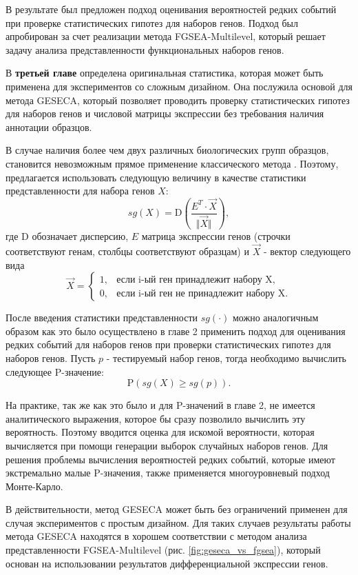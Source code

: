 В результате был предложен подход оценивания вероятностей редких событий при проверке статистических гипотез для наборов генов.
Подход был апробирован за счет реализации метода FGSEA-Multilevel, который решает задачу анализа представленности функциональных наборов генов.

В \textbf{третьей главе} определена оригинальная статистика, которая может быть применена для экспериментов со сложным дизайном.
Она послужила основой для метода GESECA, который позволяет проводить проверку статистических гипотез для наборов генов и числовой матрицы экспрессии без требования наличия аннотации образцов.

В случае наличия более чем двух различных биологических групп образцов, становится невозможным прямое применение классического метода \cite{subramanian2005gene}.
Поэтому, предлагается использовать следующую величину в качестве статистики представленности для набора генов $X$:
\[
       sg(X) = \mathrm{D} \left(\frac{E^T \cdot \overrightarrow{X}}{\Vert \overrightarrow{X} \Vert}\right),
\]
где $\mathrm{D}$ обозначает дисперсию, $E$ матрица экспрессии генов (строчки соответствуют генам, столбцы соответствуют образцам) и $\overrightarrow{X}$ - вектор следующего вида
\[
    \overrightarrow{X} = \begin{cases}
        1, & \text{если i-ый ген принадлежит набору X}, \\
        0, & \text{если i-ый ген не принадлежит набору X}.
    \end{cases}
\]

После введения статистики представленности $sg(\cdot)$ можно аналогичным образом как это было осуществлено в главе 2  применить подход для оценивания редких событий для наборов генов при проверки статистических гипотез для наборов генов.
Пусть $p$ - тестируемый набор генов, тогда необходимо вычислить следующее P-значение:
\[
    \mathrm{P} \left( sg(X) \geqslant sg(p) \right). 
\] 

На практике, так же как это было и для P-значений в главе 2, не имеется аналитического выражения, которое бы сразу позволило вычислить эту вероятность.
Поэтому вводится оценка для искомой вероятности, которая вычисляется при помощи генерации выборок случайных наборов генов.
Для решения проблемы вычисления вероятностей редких событий, которые имеют экстремально малые P-значения, также применяется многоуровневый подход Монте-Карло.

В действительности, метод GESECA может быть без ограничений применен для случая экспериментов с простым дизайном.
Для таких случаев результаты работы метода GESECA находятся в хорошем соответствии с методом анализа представленности FGSEA-Multilevel (рис. \ref{fig:geseca_vs_fgsea}), который основан на использовании результатов дифференциальной экспрессии генов.

